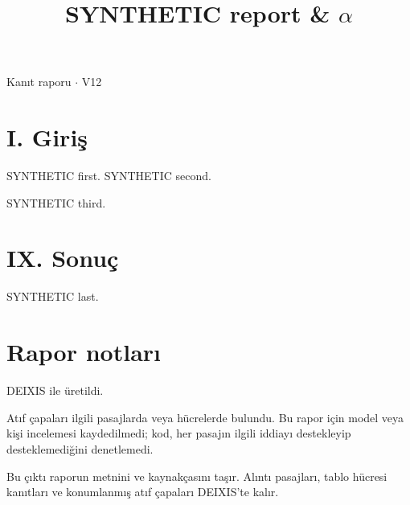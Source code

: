 \documentclass[journal]{IEEEtran}
\begin{document}
\renewcommand{\abstractname}{Özet}
\renewcommand{\IEEEkeywordsname}{Dizin Terimleri}
\renewcommand{\refname}{Kaynaklar}

\title{SYNTHETIC report \& \ensuremath{\alpha}}

\maketitle

\noindent Kanıt raporu \ensuremath{\cdot} V12

\section*{I. Giriş}

SYNTHETIC first. \cite{Synth26} SYNTHETIC second. \cite{Synth226,Synth26}

SYNTHETIC third. \cite{Synth326}

\section*{IX. Sonuç}

SYNTHETIC last. \cite{Synth326}

\section*{Rapor notları}

DEIXIS ile üretildi.

Atıf çapaları ilgili pasajlarda veya hücrelerde bulundu. Bu rapor için model veya kişi incelemesi kaydedilmedi; kod, her pasajın ilgili iddiayı destekleyip desteklemediğini denetlemedi.

Bu çıktı raporun metnini ve kaynakçasını taşır. Alıntı pasajları, tablo hücresi kanıtları ve konumlanmış atıf çapaları DEIXIS'te kalır.




\end{document}
